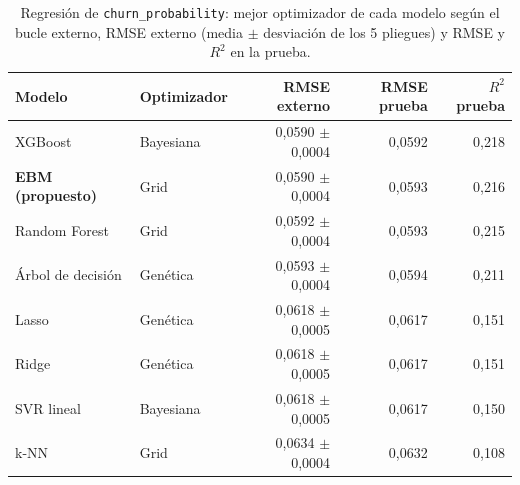\begin{table}[htbp]
\caption{Regresión de \texttt{churn\_probability}: mejor optimizador de cada modelo según el bucle externo, RMSE externo (media $\pm$ desviación de los 5 pliegues) y RMSE y $R^2$ en la prueba.}\label{tab:regresion}
\scriptsize\setlength{\tabcolsep}{2pt}
\begin{tabular}{llrrr}
\toprule
\textbf{Modelo} & \textbf{Optimizador} & \textbf{RMSE externo} & \textbf{RMSE prueba} & \textbf{$R^2$ prueba} \\
\midrule
XGBoost & Bayesiana & 0,0590 $\pm$ 0,0004 & 0,0592 & 0,218 \\
\textbf{EBM (propuesto)} & Grid & 0,0590 $\pm$ 0,0004 & 0,0593 & 0,216 \\
Random Forest & Grid & 0,0592 $\pm$ 0,0004 & 0,0593 & 0,215 \\
Árbol de decisión & Genética & 0,0593 $\pm$ 0,0004 & 0,0594 & 0,211 \\
Lasso & Genética & 0,0618 $\pm$ 0,0005 & 0,0617 & 0,151 \\
Ridge & Genética & 0,0618 $\pm$ 0,0005 & 0,0617 & 0,151 \\
SVR lineal & Bayesiana & 0,0618 $\pm$ 0,0005 & 0,0617 & 0,150 \\
k-NN & Grid & 0,0634 $\pm$ 0,0004 & 0,0632 & 0,108 \\
\bottomrule
\end{tabular}
\end{table}
